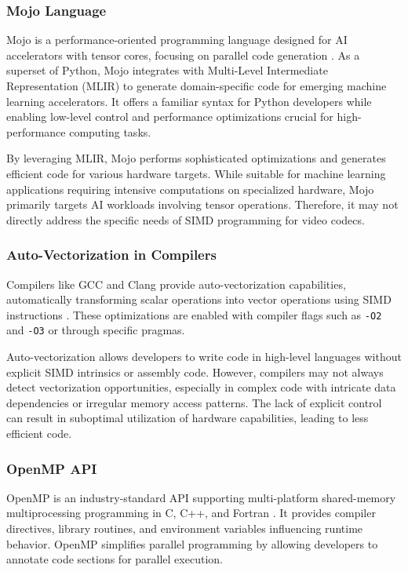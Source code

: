 \documentclass[12pt,a4paper]{article}
\begin{document}
\subsubsection{Mojo Language}

Mojo is a performance-oriented programming language designed for AI accelerators with tensor cores, focusing on parallel code generation \citep{Mojo2023}. As a superset of Python, Mojo integrates with Multi-Level Intermediate Representation (MLIR) to generate domain-specific code for emerging machine learning accelerators. It offers a familiar syntax for Python developers while enabling low-level control and performance optimizations crucial for high-performance computing tasks.

By leveraging MLIR, Mojo performs sophisticated optimizations and generates efficient code for various hardware targets. While suitable for machine learning applications requiring intensive computations on specialized hardware, Mojo primarily targets AI workloads involving tensor operations. Therefore, it may not directly address the specific needs of SIMD programming for video codecs.

\subsubsection{Auto-Vectorization in Compilers}

Compilers like GCC and Clang provide auto-vectorization capabilities, automatically transforming scalar operations into vector operations using SIMD instructions \citep{GCC2023AutoVec, Clang2023AutoVec}. These optimizations are enabled with compiler flags such as \texttt{-O2} and \texttt{-O3} or through specific pragmas.

Auto-vectorization allows developers to write code in high-level languages without explicit SIMD intrinsics or assembly code. However, compilers may not always detect vectorization opportunities, especially in complex code with intricate data dependencies or irregular memory access patterns. The lack of explicit control can result in suboptimal utilization of hardware capabilities, leading to less efficient code.

\subsubsection{OpenMP API}

OpenMP is an industry-standard API supporting multi-platform shared-memory multiprocessing programming in C, C++, and Fortran \citep{Dagum1998OpenMP}. It provides compiler directives, library routines, and environment variables influencing runtime behavior. OpenMP simplifies parallel programming by allowing developers to annotate code sections for parallel execution.
\end{document}
